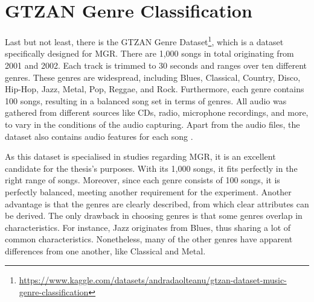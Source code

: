   \section{GTZAN Genre Classification}\label{sec:gtzan}
    Last but not least, there is the GTZAN Genre Dataset\footnote{\url{https://www.kaggle.com/datasets/andradaolteanu/gtzan-dataset-music-genre-classification}}, which is a dataset specifically designed for \ac{MGR}. There are 1,000 songs in total originating from 2001 and 2002. Each track is trimmed to 30 seconds and ranges over ten different genres. These genres are widespread, including Blues, Classical, Country, Disco, Hip-Hop, Jazz, Metal, Pop, Reggae, and Rock. Furthermore, each genre contains 100 songs, resulting in a balanced song set in terms of genres. All audio was gathered from different sources like CDs, radio, microphone recordings, and more, to vary in the conditions of the audio capturing. Apart from the audio files, the dataset also contains audio features for each song \cite{tzanetakis2002musical}. \par
    As this dataset is specialised in studies regarding \ac{MGR}, it is an excellent candidate for the thesis's purposes. With its 1,000 songs, it fits perfectly in the right range of songs. Moreover, since each genre consists of 100 songs, it is perfectly balanced, meeting another requirement for the experiment. Another advantage is that the genres are clearly described, from which clear attributes can be derived. The only drawback in choosing genres is that some genres overlap in characteristics. For instance, Jazz originates from Blues, thus sharing a lot of common characteristics. Nonetheless, many of the other genres have apparent differences from one another, like Classical and Metal.

